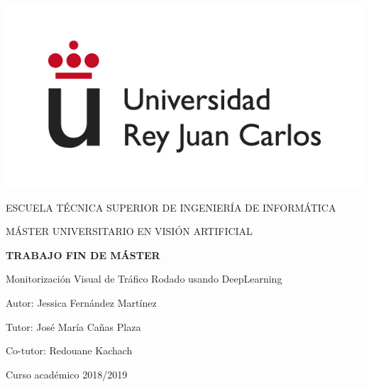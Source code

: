\begin{titlepage}
	\begin{center}
		\vspace*{3mm}
		\begin{center}
			\includegraphics[width=0.4\linewidth]{figures/logo.jpg}
		\end{center}
		\vspace{6.5mm}
		
		\fontsize{15.5}{14}\selectfont ESCUELA TÉCNICA SUPERIOR DE INGENIERÍA DE INFORMÁTICA
		\vspace{13mm}
		
		\fontsize{14}{14}\selectfont MÁSTER UNIVERSITARIO EN VISIÓN ARTIFICIAL 
		
		\vspace{55pt}
		
		\fontsize{15.7}{14}\selectfont \textbf{TRABAJO FIN DE MÁSTER} 
		
		\vspace{20mm}
		\begin{huge}
			Monitorización Visual de Tráfico Rodado usando DeepLearning
		\end{huge}
		
		\vspace{20mm}
		
		\begin{large}
			Autor: Jessica Fernández Martínez
			
			Tutor: José María Cañas Plaza
			
			Co-tutor: Redouane Kachach
			
			
			\vspace{10mm}
		\end{large}
		\begin{normalsize}
			Curso académico 2018/2019		
		\end{normalsize}
		\vspace{10mm}
		
	\end{center}
	
\end{titlepage}